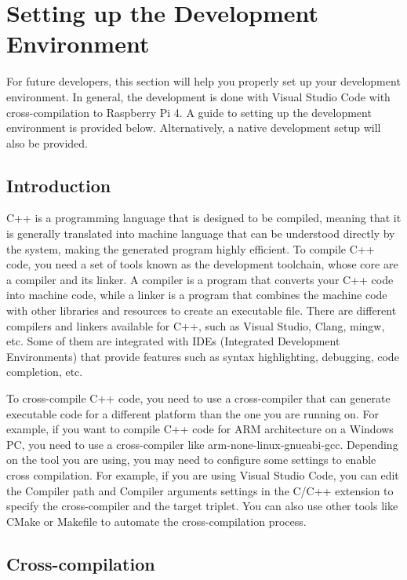 \part{Setting up the Development Environment}

For future developers, this section will help you properly set up your
development environment. In general, the development is done with Visual Studio
Code with cross-compilation to Raspberry Pi 4. A guide to setting up the
development environment is provided below. Alternatively, a native development
setup will also be provided.

\chapter{Introduction}

C++ is a programming language that is designed to be compiled, meaning that it is
generally translated into machine language that can be understood directly by
the system, making the generated program highly efficient. To compile C++ code,
you need a set of tools known as the development toolchain, whose core are a
compiler and its linker. A compiler is a program that converts your C++ code
into machine code, while a linker is a program that combines the machine code
with other libraries and resources to create an executable file. There are
different compilers and linkers available for C++, such as Visual Studio, Clang,
mingw, etc. Some of them are integrated with IDEs (Integrated Development
Environments) that provide features such as syntax highlighting, debugging, code
completion, etc.

To cross-compile C++ code, you need to use a cross-compiler that can generate
executable code for a different platform than the one you are running on. For
example, if you want to compile C++ code for ARM architecture on a Windows PC,
you need to use a cross-compiler like arm-none-linux-gnueabi-gcc. Depending on the
tool you are using, you may need to configure some settings to enable cross
compilation. For example, if you are using Visual Studio Code, you can edit the
Compiler path and Compiler arguments settings in the C/C++ extension to specify
the cross-compiler and the target triplet. You can also use other tools like
CMake or Makefile to automate the cross-compilation process.

\chapter{Cross-compilation}

